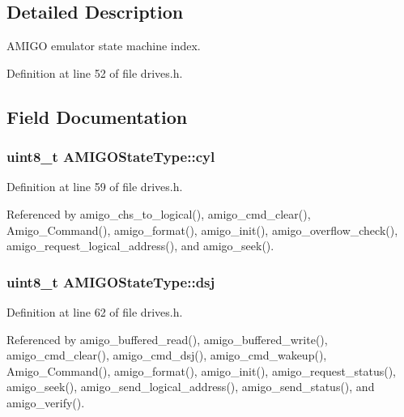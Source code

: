 \subsection{Detailed Description}
A\+M\+I\+GO emulator state machine index. 

Definition at line 52 of file drives.\+h.



\subsection{Field Documentation}
\subsubsection[{\texorpdfstring{cyl}{cyl}}]{\setlength{\rightskip}{0pt plus 5cm}uint8\+\_\+t A\+M\+I\+G\+O\+State\+Type\+::cyl}\hypertarget{structAMIGOStateType_a54b4a4f8221f9d38fb93f2d23a40e305}{}\label{structAMIGOStateType_a54b4a4f8221f9d38fb93f2d23a40e305}


Definition at line 59 of file drives.\+h.



Referenced by amigo\+\_\+chs\+\_\+to\+\_\+logical(), amigo\+\_\+cmd\+\_\+clear(), Amigo\+\_\+\+Command(), amigo\+\_\+format(), amigo\+\_\+init(), amigo\+\_\+overflow\+\_\+check(), amigo\+\_\+request\+\_\+logical\+\_\+address(), and amigo\+\_\+seek().

\subsubsection[{\texorpdfstring{dsj}{dsj}}]{\setlength{\rightskip}{0pt plus 5cm}uint8\+\_\+t A\+M\+I\+G\+O\+State\+Type\+::dsj}\hypertarget{structAMIGOStateType_ab2294deecb44cdb1675e4096dba22eb1}{}\label{structAMIGOStateType_ab2294deecb44cdb1675e4096dba22eb1}


Definition at line 62 of file drives.\+h.



Referenced by amigo\+\_\+buffered\+\_\+read(), amigo\+\_\+buffered\+\_\+write(), amigo\+\_\+cmd\+\_\+clear(), amigo\+\_\+cmd\+\_\+dsj(), amigo\+\_\+cmd\+\_\+wakeup(), Amigo\+\_\+\+Command(), amigo\+\_\+format(), amigo\+\_\+init(), amigo\+\_\+request\+\_\+status(), amigo\+\_\+seek(), amigo\+\_\+send\+\_\+logical\+\_\+address(), amigo\+\_\+send\+\_\+status(), and amigo\+\_\+verify().

